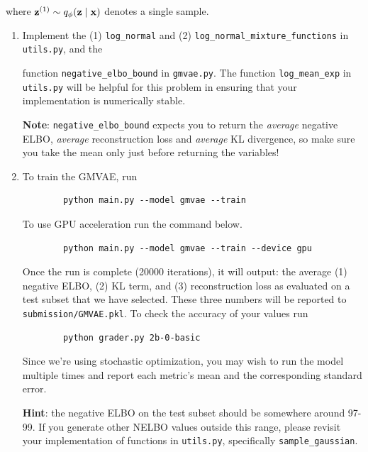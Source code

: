 where $\mathbf{z}^{(1)} \sim q_{\phi}(\mathbf{z} \mid \mathbf{x})$ denotes a single sample.

\begin{enumerate}[label=(\alph*)]
    \item {} Implement the (1) \texttt{log\_normal} and (2) \texttt{log\_normal\_mixture\_functions} in \texttt{utils.py}, and the 

    function \texttt{negative\_elbo\_bound} in \texttt{gmvae.py}. The function \texttt{log\_mean\_exp} in \texttt{utils.py} 
    will be helpful for this problem in ensuring that your implementation is numerically stable.

    \textbf{Note}: \texttt{negative\_elbo\_bound} expects you to return the \textit{average} negative ELBO, \textit{average} reconstruction loss 
    and \textit{average} KL divergence, so make sure you take the mean only just before returning the variables!

    \clearpage

    \item {} To train the GMVAE, run 
    \begin{verbatim}
        python main.py --model gmvae --train
    \end{verbatim}
    
    To use GPU acceleration run the command below.
    \begin{verbatim}
        python main.py --model gmvae --train --device gpu
    \end{verbatim}
    
    Once the run is complete (20000 iterations), it will output: the average (1) negative ELBO, (2) KL term, and (3) reconstruction loss as 
    evaluated on a test subset that we have selected. These three numbers will be reported to \texttt{submission/GMVAE.pkl}. To check the accuracy 
    of your values run

    \begin{verbatim}
        python grader.py 2b-0-basic
    \end{verbatim}
    
    Since we’re using stochastic optimization, you may wish to run the model multiple times and report each metric’s mean
    and the corresponding standard error. 
    
    \textbf{Hint}: the negative ELBO on the test subset should be somewhere around 97-99. If you generate other NELBO values outside this range, please
    revisit your implementation of functions in \texttt{utils.py}, specifically \texttt{sample\_gaussian}.


\end{enumerate}
